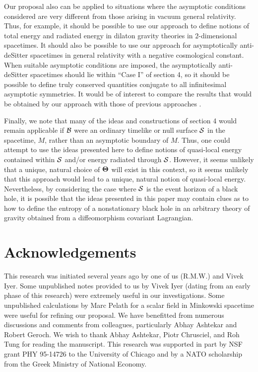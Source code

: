 Our proposal also can be applied to situations where the asymptotic
conditions considered are very different from those arising in vacuum
general relativity. Thus, for example, it should be possible to use
our approach to define notions of total energy and radiated energy in
dilaton gravity theories in $2$-dimensional spacetimes. It should also
be possible to use our approach for asymptotically anti-deSitter
spacetimes in general relativity with a negative cosmological
constant. When suitable asymptotic conditions are imposed, the
asymptotically anti-deSitter spacetimes should lie within ``Case I''
of section 4, so it should be possible to define truly conserved
quantities conjugate to all infinitesimal asymptotic symmetries. It
would be of interest to compare the results that would be obtained by
our approach with those of previous approaches \cite{ads}.

Finally, we note that many of the ideas and constructions of section 4
would remain applicable if $\cal B$ were an ordinary timelike or null
surface $\cal S$ in the spacetime, $M$, rather than an asymptotic
boundary of $M$. Thus, one could attempt to use the ideas presented
here to define notions of quasi-local energy contained within $\cal S$
and/or energy radiated through $\cal S$. However, it seems unlikely
that a unique, natural choice of ${\mbox{\boldmath $\Theta$}}$ will
exist in this context, so it seems unlikely that this approach would
lead to a unique, natural notion of quasi-local energy. Nevertheless,
by considering the case where $\cal S$ is the event horizon of a black
hole, it is possible that the ideas presented in this paper may
contain clues as to how to define the entropy of a nonstationary black
hole in an arbitrary theory of gravity obtained from a diffeomorphism
covariant Lagrangian.


\section{Acknowledgements}

This research was initiated several years ago by one of us (R.M.W.)
and Vivek Iyer. Some unpublished notes provided to us by Vivek Iyer
\cite{i} (dating from an early phase of this research) were extremely
useful in our investigations. Some unpublished calculations by Marc
Pelath for a scalar field in Minkowski spacetime were useful for
refining our proposal. We have benefitted from numerous discussions
and comments from colleagues, particularly Abhay Ashtekar and Robert
Geroch. We wish to thank Abhay Ashtekar, Piotr Chrusciel, and Roh Tung
for reading the manuscript. This research was supported in part by NSF
grant PHY 95-14726 to the University of Chicago and by a NATO
scholarship from the Greek Ministry of National Economy.


